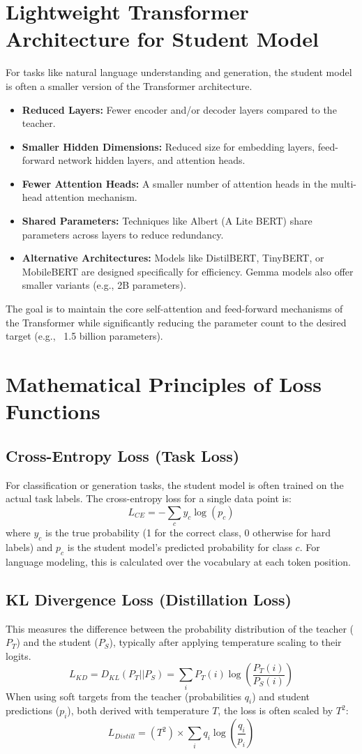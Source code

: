 \documentclass{article}
\begin{document}
\section{Lightweight Transformer Architecture for Student Model}
For tasks like natural language understanding and generation, the student model is often a smaller version of the Transformer architecture.
\begin{itemize}
    \item \textbf{Reduced Layers:} Fewer encoder and/or decoder layers compared to the teacher.
    \item \textbf{Smaller Hidden Dimensions:} Reduced size for embedding layers, feed-forward network hidden layers, and attention heads.
    \item \textbf{Fewer Attention Heads:} A smaller number of attention heads in the multi-head attention mechanism.
    \item \textbf{Shared Parameters:} Techniques like Albert (A Lite BERT) share parameters across layers to reduce redundancy.
    \item \textbf{Alternative Architectures:} Models like DistilBERT, TinyBERT, or MobileBERT are designed specifically for efficiency. Gemma models also offer smaller variants (e.g., 2B parameters).
\end{itemize}
The goal is to maintain the core self-attention and feed-forward mechanisms of the Transformer while significantly reducing the parameter count to the desired target (e.g., ~1.5 billion parameters).

\section{Mathematical Principles of Loss Functions}
\subsection{Cross-Entropy Loss (Task Loss)}
For classification or generation tasks, the student model is often trained on the actual task labels. The cross-entropy loss for a single data point is:
$$ L_{CE} = - \sum_c y_c \log(p_c) $$
where $y_c$ is the true probability (1 for the correct class, 0 otherwise for hard labels) and $p_c$ is the student model's predicted probability for class $c$. For language modeling, this is calculated over the vocabulary at each token position.

\subsection{KL Divergence Loss (Distillation Loss)}
This measures the difference between the probability distribution of the teacher ($P_T$) and the student ($P_S$), typically after applying temperature scaling to their logits.
$$ L_{KD} = D_{KL}(P_T || P_S) = \sum_i P_T(i) \log\left(\frac{P_T(i)}{P_S(i)}\right) $$
When using soft targets from the teacher (probabilities $q_i$) and student predictions ($p_i$), both derived with temperature $T$, the loss is often scaled by $T^2$:
$$ L_{Distill} = (T^2) \times \sum_i q_i \log\left(\frac{q_i}{p_i}\right) $$
\end{document}
